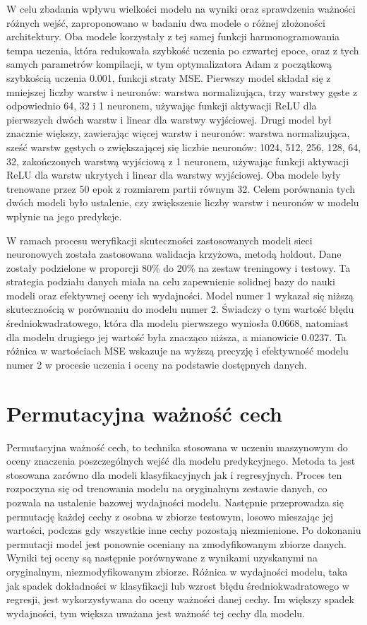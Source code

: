 \documentclass[a4paper,twoside,12pt]{book}
\begin{document}
W celu zbadania wpływu wielkości modelu na wyniki oraz sprawdzenia ważności różnych wejść, zaproponowano w badaniu dwa modele o różnej złożoności architektury. Oba modele korzystały z tej samej funkcji harmonogramowania tempa uczenia, która redukowała szybkość uczenia po czwartej epoce, oraz z tych samych parametrów kompilacji, w tym optymalizatora Adam z początkową szybkością uczenia 0.001, funkcji straty MSE.
Pierwszy model składał się z mniejszej liczby warstw i neuronów: warstwa normalizująca, trzy warstwy gęste z odpowiednio 64, 32 i 1 neuronem, używając funkcji aktywacji ReLU dla pierwszych dwóch warstw i linear dla warstwy wyjściowej.
Drugi model był znacznie większy, zawierając więcej warstw i neuronów: warstwa normalizująca, sześć warstw gęstych o zwiększającej się liczbie neuronów: 1024, 512, 256, 128, 64, 32, zakończonych warstwą wyjściową z 1 neuronem, używając funkcji aktywacji ReLU dla warstw ukrytych i linear dla warstwy wyjściowej.
Oba modele były trenowane przez 50 epok z rozmiarem partii równym 32. Celem porównania tych dwóch modeli było ustalenie, czy zwiększenie liczby warstw i neuronów w modelu wpłynie na jego predykcje.

W ramach procesu weryfikacji skuteczności zastosowanych modeli sieci neuronowych została zastosowana walidacja krzyżowa, metodą holdout. Dane zostały podzielone w proporcji 80\% do 20\% na zestaw treningowy i testowy. Ta strategia podziału danych miała na celu zapewnienie solidnej bazy do nauki modeli oraz efektywnej oceny ich wydajności. Model numer 1 wykazał się niższą skutecznością w porównaniu do modelu numer 2. Świadczy o tym wartość błędu średniokwadratowego, która dla modelu pierwszego wyniosła 0.0668, natomiast dla modelu drugiego jej wartość była znacząco niższa, a mianowicie 0.0237. Ta różnica w wartościach MSE wskazuje na wyższą precyzję i efektywność modelu numer 2 w procesie uczenia i oceny na podstawie dostępnych danych.
\newpage
\section{Permutacyjna ważność cech}
Permutacyjna ważność cech, to technika stosowana w uczeniu maszynowym do oceny znaczenia poszczególnych wejść dla modelu predykcyjnego. Metoda ta jest stosowana zarówno dla modeli klasyfikacyjnych jak i regresyjnych. Proces ten rozpoczyna się od trenowania modelu na oryginalnym zestawie danych, co pozwala na ustalenie bazowej wydajności modelu. Następnie przeprowadza się permutację każdej cechy z osobna w zbiorze testowym, losowo mieszając jej wartości, podczas gdy wszystkie inne cechy pozostają niezmienione. Po dokonaniu permutacji model jest ponownie oceniany na zmodyfikowanym zbiorze danych. Wyniki tej oceny są następnie porównywane z wynikami uzyskanymi na oryginalnym, niezmodyfikowanym zbiorze. Różnica w wydajności modelu, taka jak spadek dokładności w klasyfikacji lub wzrost błędu średniokwadratowego w regresji, jest wykorzystywana do oceny ważności danej cechy. Im większy spadek wydajności, tym większa uważana jest ważność tej cechy dla modelu.
\end{document}
